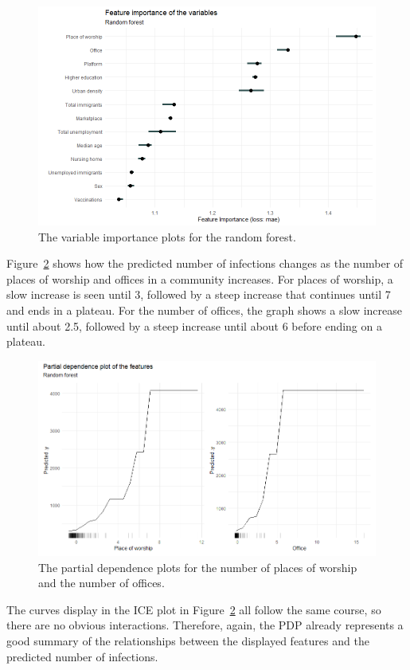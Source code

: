 \begin{figure}[H]
  \centering
  \includegraphics[width = \textwidth]{importance_rf_norway.png}
  \caption{The variable importance plots for the random forest.}
  \label{importance_rf_norway}
\end{figure}
Figure~\ref{pdp_rf_norway_1} shows how the predicted number of infections changes as the number of places of worship and offices in a community increases. For places of worship, a slow increase is seen until 3, followed by a steep increase that continues until 7 and ends in a plateau. For the number of offices, the graph shows a slow increase until about 2.5, followed by a steep increase until about 6 before ending on a plateau. \clearpage
\begin{figure}[H]
  \centering
  \includegraphics[width = \textwidth]{pdp_rf_norway_1.png}
  \caption{The partial dependence plots for the number of places of worship and the number of offices.}
  \label{pdp_rf_norway_1}
\end{figure}
The curves display in the ICE plot in Figure~\ref{pdp_rf_norway_1} all follow the same course, so there are no obvious interactions. Therefore, again, the PDP already represents a good summary of the relationships between the displayed features and the predicted number of infections. \\
